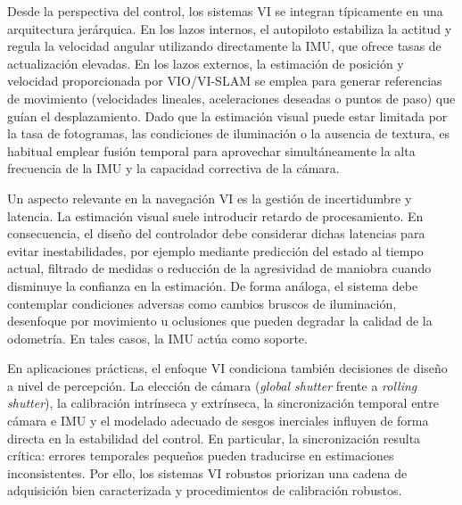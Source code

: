     Desde la perspectiva del control, los sistemas VI se integran típicamente en una arquitectura jerárquica. En los lazos internos, el
    autopiloto estabiliza la actitud y regula la velocidad angular utilizando directamente la IMU, que ofrece tasas de actualización elevadas.
    En los lazos externos, la estimación de posición y velocidad proporcionada por VIO/VI-SLAM se emplea para generar referencias de movimiento
    (velocidades lineales, aceleraciones deseadas o puntos de paso) que guían el desplazamiento. Dado que la estimación visual puede estar
    limitada por la tasa de fotogramas, las condiciones de iluminación o la ausencia de textura, es habitual emplear fusión temporal para
    aprovechar simultáneamente la alta frecuencia de la IMU y la capacidad correctiva de la cámara.

    Un aspecto relevante en la navegación VI es la gestión de incertidumbre y latencia. La estimación visual suele introducir retardo de
    procesamiento. En consecuencia, el diseño del controlador debe considerar dichas latencias para evitar inestabilidades, por ejemplo mediante predicción del
    estado al tiempo actual, filtrado de medidas o reducción de la agresividad de maniobra cuando disminuye la confianza en la estimación. De
    forma análoga, el sistema debe contemplar condiciones adversas como cambios bruscos de iluminación, desenfoque por movimiento u oclusiones que pueden degradar la 
    calidad de la odometría. En tales casos, la IMU actúa como soporte.

    En aplicaciones prácticas, el enfoque VI condiciona también decisiones de diseño a nivel de percepción. La elección de cámara (\textit{global
    shutter} frente a \textit{rolling shutter}), la calibración intrínseca y extrínseca, la sincronización temporal entre cámara e IMU y el
    modelado adecuado de sesgos inerciales influyen de forma directa en la estabilidad del control. En particular, la sincronización resulta
    crítica: errores temporales pequeños pueden traducirse en estimaciones inconsistentes. Por ello, los
    sistemas VI robustos priorizan una cadena de adquisición bien caracterizada y procedimientos de calibración robustos.



